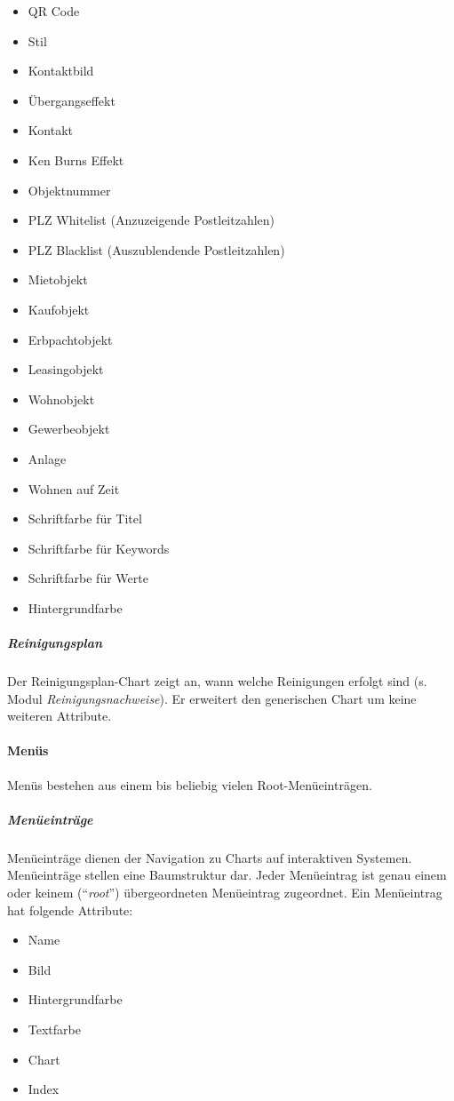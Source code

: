 \documentclass[a4paper]{article}
\begin{document}
	\begin{itemize}
	\item QR Code
	\item Stil
	\item Kontaktbild
	\item Übergangseffekt
	\item Kontakt
	\item Ken Burns Effekt
	\item Objektnummer
	\item PLZ Whitelist (Anzuzeigende Postleitzahlen)
	\item PLZ Blacklist (Auszublendende Postleitzahlen)
	\item Mietobjekt
	\item Kaufobjekt
	\item Erbpachtobjekt
	\item Leasingobjekt
	\item Wohnobjekt
	\item Gewerbeobjekt
	\item Anlage
	\item Wohnen auf Zeit
	\item Schriftfarbe für Titel
	\item Schriftfarbe für Keywords
	\item Schriftfarbe für Werte
	\item Hintergrundfarbe
	\end{itemize}
	\subparagraph{Reinigungsplan}
	Der Reinigungsplan-Chart zeigt an, wann welche Reinigungen erfolgt sind (s. Modul \emph{Reinigungsnachweise}).
	Er erweitert den generischen Chart um keine weiteren Attribute.
	\pagebreak
	\paragraph{Menüs}
	Menüs bestehen aus einem bis beliebig vielen Root-Menüeinträgen.
	\subparagraph{Menüeinträge}
	Menüeinträge dienen der Navigation zu Charts auf interaktiven Systemen.
	Menüeinträge stellen eine Baumstruktur dar. Jeder Menüeintrag ist genau einem oder keinem (\enquote{\emph{root}}) übergeordneten Menüeintrag zugeordnet.
	Ein Menüeintrag hat folgende Attribute:
	\begin{itemize}
	\item Name
	\item Bild
	\item Hintergrundfarbe
	\item Textfarbe
	\item Chart
	\item Index
	\end{itemize}
\end{document}
